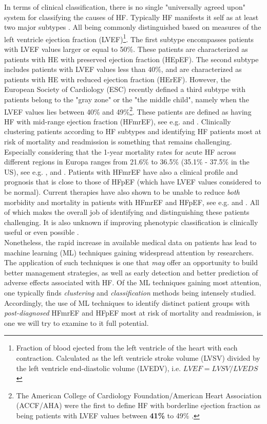 \documentclass[../thesis.tex]{subfiles}
\begin{document}
\indent In terms of clinical classification, there is no single "universally agreed upon" system for classifying the causes of HF. Typically HF manifests it self as at least two major subtypes \citep{alonso2015exploring}. All being commonly distinguished based on measures of the left ventricle ejection fraction (LVEF)\footnote{Fraction of blood ejected from the left ventricle of the heart with each contraction. Calculated as the left ventricle stroke volume (LVSV) divided by the left ventricle end-diastolic volume (LVEDV), i.e. $LVEF = LVSV / LVEDS$ \citep{cikes2015beyond}}. The first subtype encompasses patients with LVEF values larger or equal to 50\%. These patients are characterized as patients with HE with preserved ejection fraction (HEpEF). The second subtype includes patients with LVEF values less than 40\%, and are characterized as patients with HE with reduced ejection fraction (HErEF). However, the European Society of Cardiology (ESC) recently defined a third subtype with patients belong to the "gray zone" or the "the middle child", namely when the LVEF values lies between 40\% and 49\%\footnote{The American College of Cardiology Foundation/American Heart Association (ACCF/AHA) were the first to define HF with borderline ejection fraction as being patients with LVEF values between \textbf{41\%} to 49\% \citep{yancy2013}.}. These patients are defined as having HF with mid-range ejection fraction (HFmrEF), see e.g. \cite{lam2014middle} and \cite{ponikowski2016}. Clinically clustering patients according to HF subtypes and identifying HF patients most at risk of mortality and readmission is something that remains challenging. Especially considering that the 1-year mortality rates for acute HF across different regions in Europa ranges from 21.6\% to 36.5\% (35.1\% - 37.5\% in the US), see e.g. \cite{cheng2014outcomes}, \cite{inamdar2016heart} and \cite{crespo2016european}. Patients with HFmrEF have also a clinical profile and prognosis that is close to those of HFpEF (which have LVEF values considered to be normal). Current therapies have also shown to be unable to reduce \textit{both} morbidity and mortality in patients with HFmrEF and HFpEF, see e.g. \cite{ponikowski2016} and \cite{hsu2017heart}. All of which makes the overall job of identifying and distinguishing these patients challenging. It is also unknown if improving phenotypic classification is clinically useful or even possible \citep{shah2014phenomapping}.\\
\indent Nonetheless, the rapid increase in available medical data on patients has lead to machine learning (ML) techniques gaining widespread attention by researchers. The application of such techniques is one that \textit{may} offer an opportunity to build better management strategies, as well as early detection and better prediction of adverse effects associated with HF. Of the ML techniques gaining most attention, one typically finds \textit{clustering} and \textit{classification} methods being intensely studied. Accordingly, the use of ML techniques to identify distinct patient groups with \textit{post-diagnosed} HFmrEF and HFpEF most at risk of mortality and readmission, is one we will try to examine to it full potential.
\end{document}
